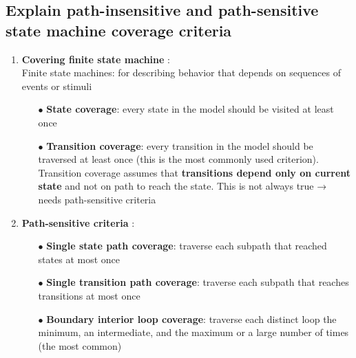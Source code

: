 \documentclass{article}
\begin{document}
\subsection{Explain path-insensitive and path-sensitive state machine coverage criteria}
\begin{enumerate}
    \item \textbf{Covering finite state machine} :\\
    Finite state machines: for describing behavior that depends on sequences of events or stimuli
    \begin{itemize}
        \item [$\bullet$]\textbf{State coverage}: every state in the model should be visited at least once
        \item [$\bullet$]\textbf{Transition coverage}: every transition in the model should be traversed at least once (this is the most commonly used criterion).\\
        Transition coverage assumes that \textbf{transitions depend only on current state} and not on path to reach the state. This is not always true → needs path-sensitive criteria
    \end{itemize}
    \item \textbf{Path-sensitive criteria} :
    \begin{itemize}
        \item [$\bullet$]\textbf{Single state path coverage}: traverse each subpath that reached states at most once
        \item [$\bullet$]\textbf{Single transition path coverage}: traverse each subpath that reaches transitions at most once
        \item [$\bullet$]\textbf{Boundary interior loop coverage}: traverse each distinct loop the minimum, an intermediate, and
the maximum or a large number of times (the most common)
    \end{itemize}
\end{enumerate}
\end{document}
